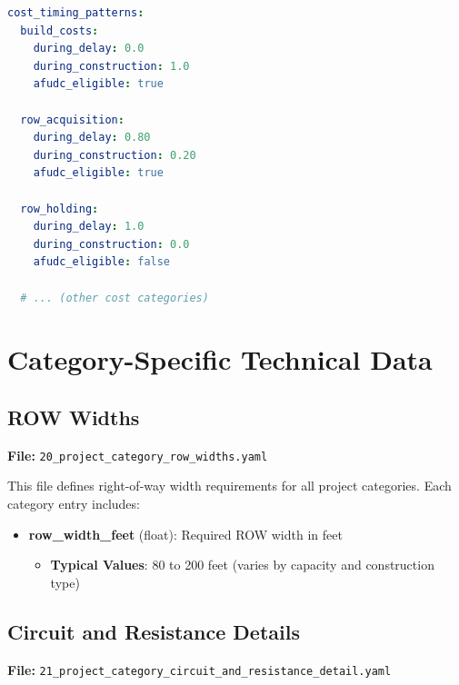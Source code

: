 \documentclass[ctcc_full_documentation.tex]{subfiles}
\begin{document}
\begin{lstlisting}[language=yaml]
cost_timing_patterns:
  build_costs:
    during_delay: 0.0
    during_construction: 1.0
    afudc_eligible: true

  row_acquisition:
    during_delay: 0.80
    during_construction: 0.20
    afudc_eligible: true

  row_holding:
    during_delay: 1.0
    during_construction: 0.0
    afudc_eligible: false

  # ... (other cost categories)
\end{lstlisting}

\section{Category-Specific Technical Data}
\label{sec:category_technical}

\subsection{ROW Widths}
\textbf{File:} \texttt{20\_project\_category\_row\_widths.yaml}

This file defines right-of-way width requirements for all project categories. Each category entry includes:
\begin{itemize}
    \item \textbf{row\_width\_feet} (float): Required ROW width in feet
    \begin{itemize}
        \item \textbf{Typical Values}: 80 to 200 feet (varies by capacity and construction type)
    \end{itemize}
\end{itemize}

\subsection{Circuit and Resistance Details}
\textbf{File:} \texttt{21\_project\_category\_circuit\_and\_resistance\_detail.yaml}
\end{document}
